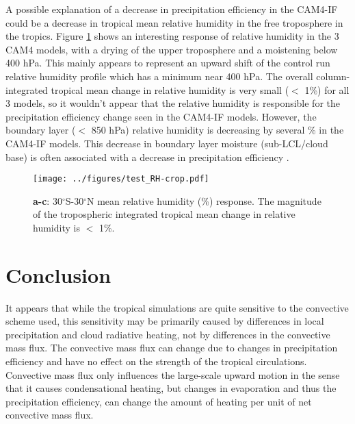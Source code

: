 \documentclass[letterpaper,12pt,titlepage,oneside,final]{book}
\begin{document}
A possible explanation of a decrease in precipitation efficiency in the CAM4-IF could be a decrease in tropical mean relative humidity in the free troposphere in the tropics. Figure \ref{fig:RH} shows an interesting response of relative humidity in the 3 CAM4 models, with a drying of the upper troposphere and a moistening below 400 hPa. This mainly appears to represent an upward shift of the control run relative humidity profile which has a minimum near 400 hPa. The overall column-integrated tropical mean change in relative humidity is very small ($<$ 1\%) for all 3 models, so it wouldn't appear that the relative humidity is responsible for the precipitation efficiency change seen in the CAM4-IF models. However, the boundary layer ($<$ 850 hPa) relative humidity is decreasing by several \% in the CAM4-IF models. This decrease in boundary layer moisture (sub-LCL/cloud base) is often associated with a decrease in precipitation efficiency \citep{market_precipitation_2003,sherwood_spread_2014}. 
\begin{figure}[H]
\centering
\noindent\texttt{[image: ../figures/test\_RH-crop.pdf]}\hfill
\caption{\textbf{a-c}: 30$^{\circ}$S-30$^{\circ}$N mean relative humidity (\%) response. The magnitude of the tropospheric integrated tropical mean change in relative humidity is $<$ 1\%. }
\label{fig:RH}
\end{figure}

\chapter{Conclusion}
It appears that while the tropical simulations are quite sensitive to the convective scheme used, this sensitivity may be primarily caused by differences in local precipitation and cloud radiative heating, not by differences in the convective mass flux. The convective mass flux can change due to changes in precipitation efficiency and have no effect on the strength of the tropical circulations. Convective mass flux only influences the large-scale upward motion in the sense that it causes condensational heating, but changes in evaporation and thus the precipitation efficiency, can change the amount of heating per unit of net convective mass flux.
\end{document}
